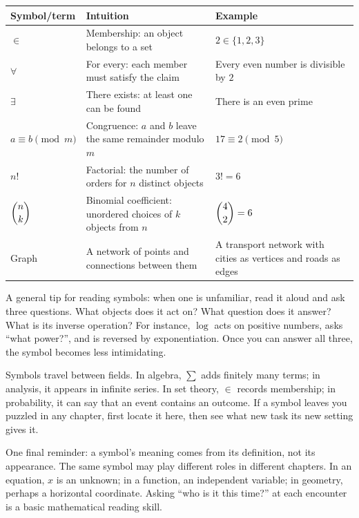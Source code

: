 \begin{center}
\begin{tabular}{lp{4.8cm}p{5.4cm}}
\toprule
Symbol/term & Intuition & Example \\
\midrule
$\in$ & Membership: an object belongs to a set & $2\in\{1,2,3\}$ \\
$\forall$ & For every: each member must satisfy the claim & Every even number is divisible by $2$ \\
$\exists$ & There exists: at least one can be found & There is an even prime \\
$a\equiv b\pmod{m}$ & Congruence: $a$ and $b$ leave the same remainder modulo $m$ & $17\equiv 2\pmod{5}$ \\
$n!$ & Factorial: the number of orders for $n$ distinct objects & $3!=6$ \\
$\dbinom{n}{k}$ & Binomial coefficient: unordered choices of $k$ objects from $n$ & $\dbinom{4}{2}=6$ \\
Graph & A network of points and connections between them & A transport network with cities as vertices and roads as edges \\
\bottomrule
\end{tabular}
\end{center}

A general tip for reading symbols: when one is unfamiliar, read it aloud and ask three questions. What objects does it act on? What question does it answer? What is its inverse operation? For instance, $\log$ acts on positive numbers, asks ``what power?'', and is reversed by exponentiation. Once you can answer all three, the symbol becomes less intimidating.

\begin{lianjie}
Symbols travel between fields. In algebra, $\sum$ adds finitely many terms; in analysis, it appears in infinite series. In set theory, $\in$ records membership; in probability, it can say that an event contains an outcome. If a symbol leaves you puzzled in any chapter, first locate it here, then see what new task its new setting gives it.
\end{lianjie}

One final reminder: a symbol's meaning comes from its definition, not its appearance. The same symbol may play different roles in different chapters. In an equation, $x$ is an unknown; in a function, an independent variable; in geometry, perhaps a horizontal coordinate. Asking ``who is it this time?'' at each encounter is a basic mathematical reading skill.
